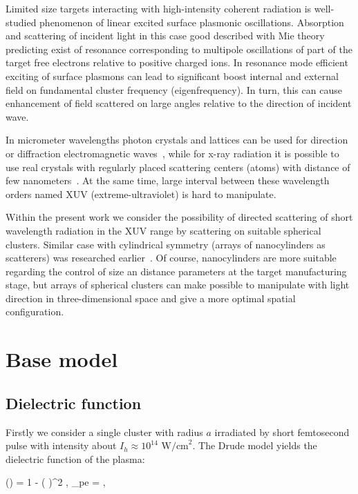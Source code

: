\documentclass[conference]{IEEEtran}
\begin{document}
Limited size targets interacting with high-intensity coherent radiation is well-studied phenomenon of linear excited surface plasmonic oscillations. Absorption and scattering of incident light in this case good described with Mie theory predicting exist of resonance corresponding to multipole oscillations of part of the target free electrons relative to positive charged ions. In resonance mode efficient exciting of surface plasmons can lead to significant boost internal and external field on fundamental cluster frequency (eigenfrequency). In turn, this can cause enhancement of field scattered on large angles relative to the direction of incident wave.

In micrometer wavelengths photon crystals and lattices can be used for direction or diffraction electromagnetic waves~\cite{lin_zhang}, while for x-ray radiation it is possible to use real crystals with regularly placed scattering centers (atoms) with distance of few nanometers~\cite{batterman_cole}. At the same time, large interval between these wavelength orders named XUV (extreme-ultraviolet) is hard to manipulate.

Within the present work we consider the possibility of directed scattering of short wavelength radiation in the XUV range by scattering on suitable spherical clusters. Similar case with cylindrical symmetry (arrays of nanocylinders as scatterers) was researched earlier~\cite{andreev_lecz}. Of course, nanocylinders are more suitable regarding the control of size an distance parameters at the target manufacturing stage, but arrays of spherical clusters can make possible to manipulate with light direction in three-dimensional space and give a more optimal spatial configuration.

\section{Base model}

\subsection{Dielectric function}

Firstly we consider a single cluster with radius $a$ irradiated by short femtosecond pulse with intensity about $I_{h} \approx 10^{14}$ $\textrm{W/cm}^2$. The Drude model yields the dielectric function of the plasma:

	\eq
		\varepsilon (\w) = 1 - \left(  \right)^2 , \qquad \w_{pe} = ,
		\label{eps_plasma}
	\qe
\end{document}
